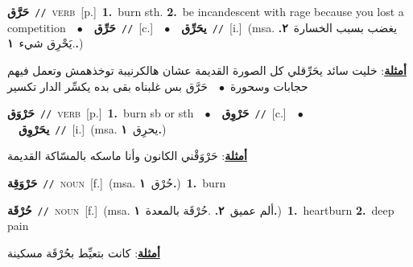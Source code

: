\documentclass[10pt,a4paper,twoside]{article} %
\begin{document}
\begin{multicols}{2}
{\setlength\topsep{0pt}\textbf{\foreignlanguage{arabic}{حَرَّق}}\ {\color{gray}\texttt{//}\color{black}}\ \textsc{verb}\ [p.]\ \textbf{1.}~burn sth.  \textbf{2.}~be incandescent with rage because you lost a competition\ \ $\bullet$\ \ \setlength\topsep{0pt}\textbf{\foreignlanguage{arabic}{حَرِّق}}\ {\color{gray}\texttt{//}\color{black}}\ [c.]\ \ $\bullet$\ \ \setlength\topsep{0pt}\textbf{\foreignlanguage{arabic}{يحَرِّق}}\ {\color{gray}\texttt{//}\color{black}}\ [i.]\ \color{gray}(msa. \foreignlanguage{arabic}{يغضب بسبب الخسارة}~\foreignlanguage{arabic}{\textbf{٢.}}  .\foreignlanguage{arabic}{يَحْرِق شيء}~\foreignlanguage{arabic}{\textbf{١.}})\color{black}\  \begin{flushright}\color{gray}\foreignlanguage{arabic}{\textbf{\underline{\foreignlanguage{arabic}{أمثلة}}}: خليت سائد يحَرِّقلي كل الصورة القديمة عشان هالكرنيبة توخذهمش وتعمل فيهم حجابات وسحورة\ $\bullet$\ \  حَرَّق بس غلبناه بقى بده يكسِّر الدار تكسير}\end{flushright}\color{black}} \vspace{2mm}

{\setlength\topsep{0pt}\textbf{\foreignlanguage{arabic}{حَرْوَق}}\ {\color{gray}\texttt{//}\color{black}}\ \textsc{verb}\ [p.]\ \textbf{1.}~burn sb or sth\ \ $\bullet$\ \ \setlength\topsep{0pt}\textbf{\foreignlanguage{arabic}{حَرْوِق}}\ {\color{gray}\texttt{//}\color{black}}\ [c.]\ \ $\bullet$\ \ \setlength\topsep{0pt}\textbf{\foreignlanguage{arabic}{يحَرْوِق}}\ {\color{gray}\texttt{//}\color{black}}\ [i.]\ \color{gray}(msa. \foreignlanguage{arabic}{يحرِق}~\foreignlanguage{arabic}{\textbf{١.}})\color{black}\  \begin{flushright}\color{gray}\foreignlanguage{arabic}{\textbf{\underline{\foreignlanguage{arabic}{أمثلة}}}: حَرْوَقْني الكانون وأنا ماسكه بالمسّاكة القديمة}\end{flushright}\color{black}} \vspace{2mm}

{\setlength\topsep{0pt}\textbf{\foreignlanguage{arabic}{حَرْوَقِة}}\ {\color{gray}\texttt{//}\color{black}}\ \textsc{noun}\ [f.]\ \color{gray}(msa. \foreignlanguage{arabic}{حُرْق}~\foreignlanguage{arabic}{\textbf{١.}})\color{black}\ \textbf{1.}~burn\ } \vspace{2mm}

{\setlength\topsep{0pt}\textbf{\foreignlanguage{arabic}{حُرْقَة}}\ {\color{gray}\texttt{//}\color{black}}\ \textsc{noun}\ [f.]\ \color{gray}(msa. \foreignlanguage{arabic}{ألم عميق}~\foreignlanguage{arabic}{\textbf{٢.}}  .\foreignlanguage{arabic}{حُرْقَة بالمعدة}~\foreignlanguage{arabic}{\textbf{١.}})\color{black}\ \textbf{1.}~heartburn  \textbf{2.}~deep pain\  \begin{flushright}\color{gray}\foreignlanguage{arabic}{\textbf{\underline{\foreignlanguage{arabic}{أمثلة}}}: كانت بتعيِّط بحُرْقَة مسكينة}\end{flushright}\color{black}} \vspace{2mm}


\end{multicols}
\end{document}
